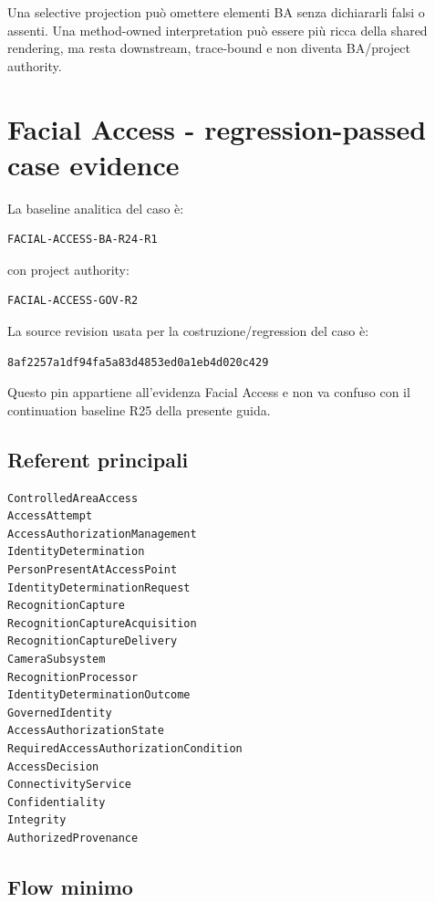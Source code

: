 \documentclass[11pt,a4paper]{article}
\begin{document}
Una selective projection può omettere elementi BA senza dichiararli falsi o assenti. Una method-owned interpretation può essere più ricca della shared rendering, ma resta downstream, trace-bound e non diventa BA/project authority.

\section{Facial Access - regression-passed case evidence}

La baseline analitica del caso è:

\begin{lstlisting}
FACIAL-ACCESS-BA-R24-R1
\end{lstlisting}

con project authority:

\begin{lstlisting}
FACIAL-ACCESS-GOV-R2
\end{lstlisting}

La source revision usata per la costruzione/regression del caso è:

\begin{lstlisting}
8af2257a1df94fa5a83d4853ed0a1eb4d020c429
\end{lstlisting}

Questo pin appartiene all'evidenza Facial Access e non va confuso con il continuation baseline R25 della presente guida.

\subsection{Referent principali}

\begin{lstlisting}
ControlledAreaAccess
AccessAttempt
AccessAuthorizationManagement
IdentityDetermination
PersonPresentAtAccessPoint
IdentityDeterminationRequest
RecognitionCapture
RecognitionCaptureAcquisition
RecognitionCaptureDelivery
CameraSubsystem
RecognitionProcessor
IdentityDeterminationOutcome
GovernedIdentity
AccessAuthorizationState
RequiredAccessAuthorizationCondition
AccessDecision
ConnectivityService
Confidentiality
Integrity
AuthorizedProvenance
\end{lstlisting}

\subsection{Flow minimo}
\end{document}
